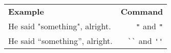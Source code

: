 \documentclass[varwidth,crop]{standalone}
\begin{document}
\begin{tabular}{lr}
    \textbf{Example} & \textbf{Command}\\
    He said "something", alright. & \verb|"| and \verb|"|\\
    He said ``something'', alright. & \verb|``| and \verb|''|\\
\end{tabular}
\end{document}
